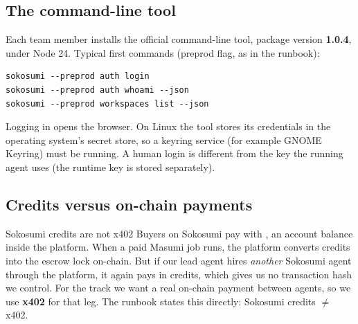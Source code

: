 \begin{center}
\end{center}

\subsection{The  command-line tool}
Each team member installs the official command-line tool, package  version \textbf{1.0.4}, under Node 24. Typical first commands (preprod flag, as in the runbook):
\begin{lstlisting}
sokosumi --preprod auth login
sokosumi --preprod auth whoami --json
sokosumi --preprod workspaces list --json
\end{lstlisting}
Logging in opens the browser. On Linux the tool stores its credentials in the operating system's secret store, so a keyring service (for example GNOME Keyring) must be running. A human login is different from the key the running agent uses (the runtime key is stored separately).

\subsection{Credits versus on-chain payments}
\begin{conceptbox}{Sokosumi credits are not x402}
Buyers on Sokosumi pay with , an account balance inside the platform. When a paid Masumi job runs, the platform converts credits into the escrow lock on-chain. But if our lead agent hires \emph{another} Sokosumi agent through the platform, it again pays in credits, which gives us no transaction hash we control. For the track we want a real on-chain payment between agents, so we use \textbf{x402} for that leg. The runbook states this directly: Sokosumi credits $\neq$ x402.
\end{conceptbox}

